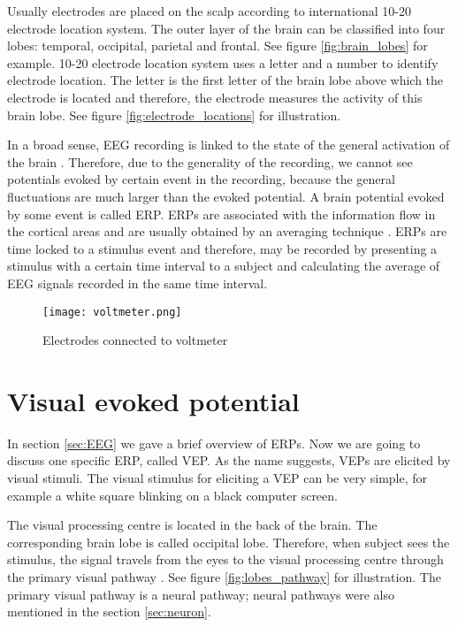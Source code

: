 Usually electrodes are placed on the scalp according to international 10-20 electrode location system. The outer layer of the brain can be classified into four lobes: temporal, occipital, parietal and frontal. See figure \ref{fig:brain_lobes} for example. 10-20 electrode location system uses a letter and a number to identify electrode location. The letter is the first letter of the brain lobe above which the electrode is located and therefore, the electrode measures the activity of this brain lobe. See figure \ref{fig:electrode_locations} for illustration.

In a broad sense, \gls{EEG} recording is linked to the state of the general activation of the brain \cite{VEP}. Therefore, due to the generality of the recording, we cannot see potentials evoked by certain event in the recording, because the general fluctuations are much larger than the evoked potential. A brain potential evoked by some event is called \gls{ERP}. \glspl{ERP} are associated with the information flow in the cortical areas and are usually obtained by an averaging technique \cite{ERP}. \glspl{ERP} are time locked to a stimulus event and therefore, may be recorded by presenting a stimulus with a certain time interval to a subject and calculating the average of \gls{EEG} signals recorded in the same time interval.

\begin{figure}[h]
	\centering
	\texttt{[image: voltmeter.png]}
	\caption{Electrodes connected to voltmeter \cite[p.~120]{ERP}}
	\label{fig:voltmeter}
\end{figure}

\section{Visual evoked potential}

In section \ref{sec:EEG} we gave a brief overview of \glspl{ERP}. Now we are going to discuss one specific \gls{ERP}, called \gls{VEP}. As the name suggests, \glspl{VEP} are elicited by visual stimuli. The visual stimulus for eliciting a \gls{VEP} can be very simple, for example a white square blinking on a black computer screen.

The visual processing centre is located in the back of the brain. The corresponding brain lobe is called occipital lobe. Therefore, when subject sees the stimulus, the signal travels from the eyes to the visual processing centre through the primary visual pathway \cite{neuroscience}. See figure \ref{fig:lobes_pathway} for illustration. The primary visual pathway is a neural pathway; neural pathways were also mentioned in the section \ref{sec:neuron}.


